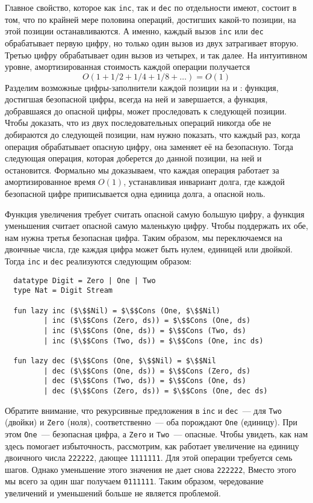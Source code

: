 Главное свойство, которое как \lstinline!inc!, так и \lstinline!dec!
по отдельности имеют, состоит в том, что по крайней мере половина
операций, достигших какой-то позиции, на этой позиции
останавливаются. А именно, каждый вызов \lstinline!inc! или
\lstinline!dec! обрабатывает первую цифру, но только один вызов из
двух затрагивает вторую. Третью цифру обрабатывает один вызов из
четырех, и так далее. На интуитивном уровне, амортизированная
стоимость каждой операции получается
$$
O(1 + 1/2 + 1/4 + 1/8 + \ldots) = O(1)
$$
Разделим возможные цифры-заполнители каждой позиции на
 и : функция,
достигшая безопасной цифры, всегда на ней и завершается, а функция,
добравшаяся до опасной цифры, может проследовать к следующей
позиции. Чтобы доказать, что из двух последовательных операций никогда
обе не добираются до следующей позиции, нам нужно показать, что каждый
раз, когда операция обрабатывает опасную цифру, она заменяет её на
безопасную. Тогда следующая операция, которая доберется до данной
позиции, на ней и остановится. Формально мы доказываем, что каждая
операция работает за амортизированное время $O(1)$, устанавливая
инвариант долга, где каждой безопасной цифре приписывается одна
единица долга, а опасной ноль.

Функция увеличения требует считать опасной самую большую цифру, а
функция уменьшения считает опасной самую маленькую цифру. Чтобы
поддержать их обе, нам нужна третья безопасная цифра. Таким образом,
мы переключаемся на  двоичные числа, где
каждая цифра может быть нулем, единицей или двойкой. Тогда
\lstinline!inc! и \lstinline!dec! реализуются следующим образом:
\begin{lstlisting}
  datatype Digit = Zero | One | Two
  type Nat = Digit Stream

  fun lazy inc ($\$$Nil) = $\$$Cons (One, $\$$Nil)
         | inc ($\$$Cons (Zero, ds)) = $\$$Cons (One, ds)
         | inc ($\$$Cons (One, ds)) = $\$$Cons (Two, ds)
         | inc ($\$$Cons (Two, ds)) = $\$$Cons (One, inc ds)

  fun lazy dec ($\$$Cons (One, $\$$Nil) = $\$$Nil
         | dec ($\$$Cons (One, ds)) = $\$$Cons (Zero, ds)
         | dec ($\$$Cons (Two, ds)) = $\$$Cons (One, ds)
         | dec ($\$$Cons (Zero, ds)) = $\$$Cons (One, dec ds)
\end{lstlisting}
Обратите внимание, что рекурсивные предложения в \lstinline!inc! и
\lstinline!dec!~--- для \lstinline!Two! (двойки) и \lstinline!Zero! (ноля),
соответственно~--- оба порождают \lstinline!One! (единицу). При этом
\lstinline!One!~--- безопасная цифра, а \lstinline!Zero! и
\lstinline!Two!~--- опасные. Чтобы увидеть, как нам здесь помогает
избыточность, рассмотрим, как работает увеличение на единицу двоичного
числа \texttt{222222}, дающее \texttt{1111111}. Для этой операции
требуется семь шагов. Однако уменьшение этого значения не дает снова
\texttt{222222}, Вместо этого мы всего за один шаг получаем
\texttt{0111111}. Таким образом, чередование увеличений и уменьшений
больше не является проблемой.

